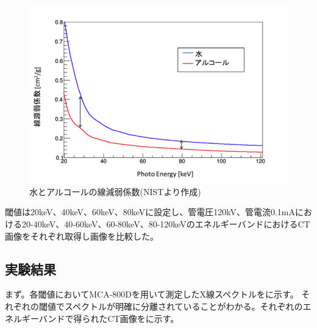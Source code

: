 \begin{figure}[H]
 \begin{center}
 \includegraphics[bb=0.000000 0.000000 344.611512 237.580360,width=0.8\hsize]{image2/chapter5/water_alchol.png} 
 \end{center}
 \caption{水とアルコールの線減弱係数(NISTより作成)}
 \label{fig:water_alchol}
\end{figure}

閾値は20keV、40keV、60keV、80keVに設定し、管電圧120kV、管電流0.1mAにおける20-40keV、40-60keV、60-80keV、80-120keVのエネルギーバンドにおけるCT画像をそれぞれ取得し画像を比較した。


\subsection{実験結果}
まず。各閾値においてMCA-800Dを用いて測定したX線スペクトルをに示す。
それぞれの閾値でスペクトルが明確に分離されていることがわかる。それぞれのエネルギーバンドで得られたCT画像をに示す。

